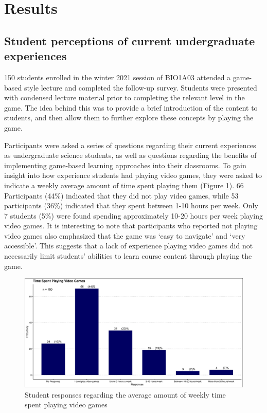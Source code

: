 \documentclass[10pt]{article}
\providecommand{\figref}[1]{(Figure \ref{#1})}  %
\begin{document}
\section{Results}

\subsection{Student perceptions of current undergraduate experiences}

150 students enrolled in the winter 2021 session of BIO1A03 attended a game-based style lecture and completed the follow-up survey. Students were presented with condensed lecture material prior to completing the relevant level in the game. The idea behind this was to provide a brief introduction of the content to students, and then allow them to further explore these concepts by playing the game. 

Participants were asked a series of questions regarding their current experiences as undergraduate science students, as well as questions regarding the benefits of implementing game-based learning approaches into their classrooms. To gain insight into how experience students had playing video games, they were asked to indicate a weekly average amount of time spent playing them \figref{fig:1}. 66 Participants (44\%) indicated that they did not play video games, while 53 participants (36\%) indicated that they spent between 1-10 hours per week. Only 7 students (5\%) were found spending approximately 10-20 hours per week playing video games. It is interesting to note that participants who reported not playing video games also emphasized that the game was `easy to navigate' and `very accessible'. This suggests that a lack of experience playing video games did not necessarily limit students' abilities to learn course content through playing the game.

\begin{figure}[H]
	\includegraphics[width=\textwidth]{figures_4f06/time_spent_playing_videogames.jpg}
	\caption{Student responses regarding the average amount of weekly time spent playing video games}
	\label{fig:1}
\end{figure}
\end{document}
